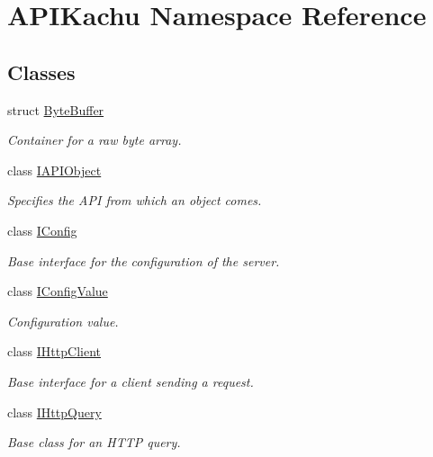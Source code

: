 \hypertarget{namespace_a_p_i_kachu}{}\section{A\+P\+I\+Kachu Namespace Reference}
\label{namespace_a_p_i_kachu}
\subsection*{Classes}
\begin{DoxyCompactItemize}
\item 
struct \hyperlink{struct_a_p_i_kachu_1_1_byte_buffer}{Byte\+Buffer}
\begin{DoxyCompactList}\small\item\em Container for a raw byte array. \end{DoxyCompactList}\item 
class \hyperlink{class_a_p_i_kachu_1_1_i_a_p_i_object}{I\+A\+P\+I\+Object}
\begin{DoxyCompactList}\small\item\em Specifies the A\+PI from which an object comes. \end{DoxyCompactList}\item 
class \hyperlink{class_a_p_i_kachu_1_1_i_config}{I\+Config}
\begin{DoxyCompactList}\small\item\em Base interface for the configuration of the server. \end{DoxyCompactList}\item 
class \hyperlink{class_a_p_i_kachu_1_1_i_config_value}{I\+Config\+Value}
\begin{DoxyCompactList}\small\item\em Configuration value. \end{DoxyCompactList}\item 
class \hyperlink{class_a_p_i_kachu_1_1_i_http_client}{I\+Http\+Client}
\begin{DoxyCompactList}\small\item\em Base interface for a client sending a request. \end{DoxyCompactList}\item 
class \hyperlink{class_a_p_i_kachu_1_1_i_http_query}{I\+Http\+Query}
\begin{DoxyCompactList}\small\item\em Base class for an H\+T\+TP query. \end{DoxyCompactList}\item 

\end{DoxyCompactItemize}

